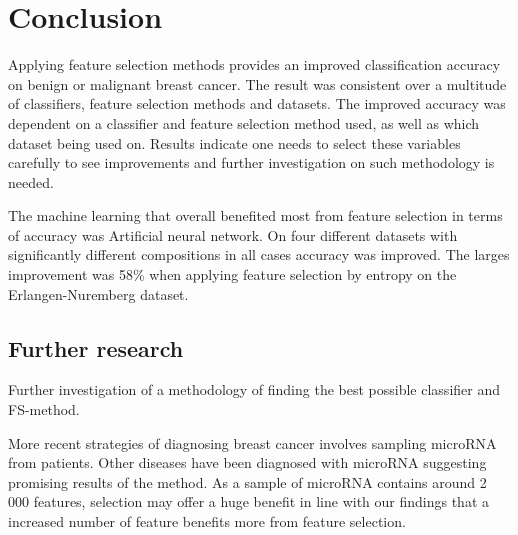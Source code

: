 \chapter{Conclusion}




Applying feature selection methods provides an improved classification accuracy on benign or malignant breast cancer. The result was consistent over a multitude of classifiers, feature selection methods and datasets. The improved accuracy was dependent on a classifier and feature selection method used, as well as which dataset being used on. Results indicate one needs to select these variables carefully to see improvements and further investigation on such methodology is needed.


The machine learning that overall benefited most from feature selection in terms of accuracy was Artificial neural network. On four different datasets with significantly different compositions in all cases accuracy was improved. The larges improvement was 58\% when applying feature selection by entropy on the Erlangen-Nuremberg dataset.


\section{Further research}

Further investigation of a methodology of finding the best possible classifier and FS-method.

More recent strategies of diagnosing breast cancer involves sampling microRNA from patients. Other diseases have been diagnosed with microRNA suggesting promising results of the method. As a sample of microRNA contains around 2 000 features, selection may offer a huge benefit in line with our findings that a increased number of feature benefits more from feature selection.
